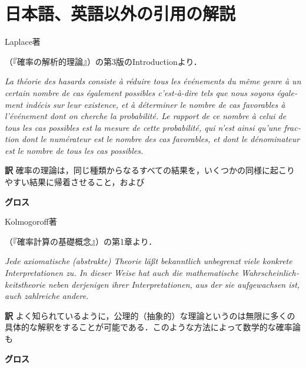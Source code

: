 \documentclass[main.tex]{subfiles}
\begin{document}
\chapter{日本語、英語以外の引用の解説}

\begin{quotebox}
\begin{numberedquote}
Laplace著\begin{french}\end{french}（『確率の解析的理論』）の第3版のIntroductionより．

\bigskip

\begin{french}
{\itshape
La théorie des hasards consiste à réduire tous les événements du même genre à un certain nombre
de cas également possibles c'est-à-dire tels que nous soyons également indécis sur leur existence,
et à déterminer le nombre de cas favorables à l'événement dont on cherche la probabilité.
Le rapport de ce nombre à celui de tous les cas possibles est la mesure de cette probabilité,
qui n'est ainsi qu'une fraction dont le numérateur est le nombre des cas favorables,
et dont le dénominateur est le nombre de tous les cas possibles.}
\end{french}

\end{numberedquote}
\end{quotebox}

\noindent \textbf{\gtfamily 訳} 確率の理論は，同じ種類からなるすべての結果を，いくつかの同様に起こりやすい結果に帰着させること，および


\noindent \textbf{\gtfamily グロス}


\begin{quotebox}
\begin{numberedquote}
Kolmogoroff著\begin{german}\end{german}（『確率計算の基礎概念』）の第1章より．

\bigskip

\begin{german}
{\itshape
Jede axiomatische (abstrakte) Theorie läßt
bekanntlich unbegrenzt viele konkrete Interpretationen zu.
In dieser Weise hat auch die mathematische Wahrscheinlichkeitstheorie
neben derjenigen ihrer Interpretationen,
aus der sie aufgewachsen ist,
auch zahlreiche andere.}
\end{german}
\end{numberedquote}
\end{quotebox}

\noindent \textbf{\gtfamily 訳} よく知られているように，公理的（抽象的）な理論というのは無限に多くの具体的な解釈をすることが可能である．このような方法によって数学的な確率論も

\noindent \textbf{\gtfamily グロス}

\end{document}
